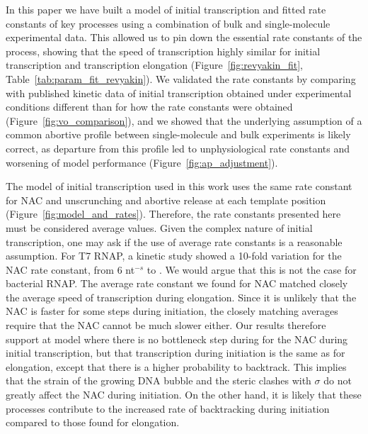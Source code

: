 %
In this paper we have built a model of initial transcription and fitted rate
constants of key processes using a combination of bulk and single-molecule
experimental data. This allowed us to pin down the essential rate constants of
the process, showing that the speed of transcription highly similar for
initial transcription and transcription elongation
(Figure~\ref{fig:revyakin_fit}, Table~\ref{tab:param_fit_revyakin}). We
validated the rate constants by comparing with published kinetic data of
initial transcription obtained under experimental conditions different than
for how the rate constants were obtained (Figure~\ref{fig:vo_comparison}), and
we showed that the underlying assumption of a common abortive profile between
single-molecule and bulk experiments is likely correct, as departure from this
profile led to unphysiological rate constants and worsening of model
performance (Figure~\ref{fig:ap_adjustment}).

The model of initial transcription used in this work uses the same rate
constant for NAC and unscrunching and abortive release at each template
position (Figure~\ref{fig:model_and_rates}). Therefore, the rate constants
presented here must be considered average values. Given the complex nature of
initial transcription, one may ask if the use of average rate constants is a reasonable
assumption. For T7 RNAP, a kinetic study showed a 10-fold variation for the
NAC rate constant, from 6 nt$^{-s}$ to \cite{tang_real-time_2009}. We would
argue that this is not the case for bacterial RNAP. The average rate constant
we found for NAC matched closely the average speed of transcription during
elongation. Since it is unlikely that the NAC is faster for some steps during
initiation, the closely matching averages require that the NAC cannot be much
slower either. Our results therefore support at model where there is no
bottleneck step during for the NAC during initial transcription, but that
transcription during initiation is the same as for elongation, except that
there is a higher probability to backtrack. This implies that the strain of
the growing DNA bubble and the steric clashes with $\sigma$ do not greatly
affect the NAC during initiation. On the other hand, it is likely that these
processes contribute to the increased rate of backtracking during initiation
compared to those found for elongation.


